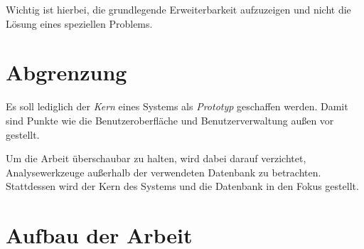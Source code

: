 Wichtig ist hierbei, die grundlegende Erweiterbarkeit aufzuzeigen
und nicht die Lösung eines speziellen Problems.

\section{Abgrenzung}
\label{sec:intro:abgrenzung}

Es soll lediglich der \emph{Kern} eines Systems als \emph{Prototyp} geschaffen werden.
Damit sind Punkte wie die Benutzeroberfläche und Benutzerverwaltung
außen vor gestellt.

Um die Arbeit überschaubar zu halten, wird dabei darauf verzichtet, Analysewerkzeuge außerhalb der verwendeten Datenbank zu betrachten.
Stattdessen wird der Kern des Systems und die Datenbank in den Fokus gestellt.


\section{Aufbau der Arbeit}
\label{sec:intro:aufbau}
